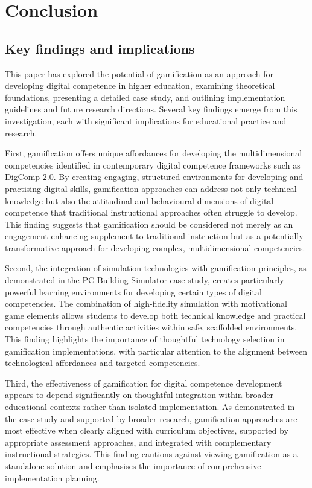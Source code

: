 \documentclass[cte]{acnsart}
\begin{document}
\section{Conclusion}

\subsection{Key findings and implications}

This paper has explored the potential of gamification as an approach for developing digital competence in higher education, examining theoretical foundations, presenting a detailed case study, and outlining implementation guidelines and future research directions. Several key findings emerge from this investigation, each with significant implications for educational practice and research.

First, gamification offers unique affordances for developing the multidimensional competencies identified in contemporary digital competence frameworks such as DigComp 2.0. By creating engaging, structured environments for developing and practising digital skills, gamification approaches can address not only technical knowledge but also the attitudinal and behavioural dimensions of digital competence that traditional instructional approaches often struggle to develop. This finding suggests that gamification should be considered not merely as an engagement-enhancing supplement to traditional instruction but as a potentially transformative approach for developing complex, multidimensional competencies.

Second, the integration of simulation technologies with gamification principles, as demonstrated in the PC Building Simulator case study, creates particularly powerful learning environments for developing certain types of digital competencies. The combination of high-fidelity simulation with motivational game elements allows students to develop both technical knowledge and practical competencies through authentic activities within safe, scaffolded environments. This finding highlights the importance of thoughtful technology selection in gamification implementations, with particular attention to the alignment between technological affordances and targeted competencies.

Third, the effectiveness of gamification for digital competence development appears to depend significantly on thoughtful integration within broader educational contexts rather than isolated implementation. As demonstrated in the case study and supported by broader research, gamification approaches are most effective when clearly aligned with curriculum objectives, supported by appropriate assessment approaches, and integrated with complementary instructional strategies. This finding cautions against viewing gamification as a standalone solution and emphasises the importance of comprehensive implementation planning.
\end{document}
